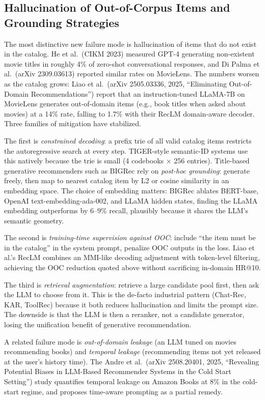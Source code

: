 \subsection{Hallucination of Out-of-Corpus Items and Grounding Strategies}\label{hallucination-of-out-of-corpus-items-and-grounding-strategies}

The most distinctive new failure mode is hallucination of items that do not exist in the catalog. He et al.~(CIKM 2023) measured GPT-4 generating non-existent movie titles in roughly 4\% of zero-shot conversational responses, and Di Palma et al.~(arXiv 2309.03613) reported similar rates on MovieLens. The numbers worsen as the catalog grows: Liao et al.~(arXiv 2505.03336, 2025, ``Eliminating Out-of-Domain Recommendations'') report that an instruction-tuned LLaMA-7B on MovieLens generates out-of-domain items (e.g., book titles when asked about movies) at a 14\% rate, falling to 1.7\% with their RecLM domain-aware decoder. Three families of mitigation have stabilized.

The first is \emph{constrained decoding}: a prefix trie of all valid catalog items restricts the autoregressive search at every step. TIGER-style semantic-ID systems use this natively because the trie is small (4 codebooks × 256 entries). Title-based generative recommenders such as BIGRec rely on \emph{post-hoc grounding}: generate freely, then map to nearest catalog item by L2 or cosine similarity in an embedding space. The choice of embedding matters: BIGRec ablates BERT-base, OpenAI text-embedding-ada-002, and LLaMA hidden states, finding the LLaMA embedding outperforms by 6--9\% recall, plausibly because it shares the LLM's semantic geometry.

The second is \emph{training-time supervision against OOC}: include ``the item must be in the catalog'' in the system prompt, penalize OOC outputs in the loss. Liao et al.'s RecLM combines an MMI-like decoding adjustment with token-level filtering, achieving the OOC reduction quoted above without sacrificing in-domain HR@10.

The third is \emph{retrieval augmentation}: retrieve a large candidate pool first, then ask the LLM to choose from it. This is the de-facto industrial pattern (Chat-Rec, KAR, ToolRec) because it both reduces hallucination and limits the prompt size. The downside is that the LLM is then a reranker, not a candidate generator, losing the unification benefit of generative recommendation.

A related failure mode is \emph{out-of-domain leakage} (an LLM tuned on movies recommending books) and \emph{temporal leakage} (recommending items not yet released at the user's history time). The Andre et al.~(arXiv 2508.20401, 2025, ``Revealing Potential Biases in LLM-Based Recommender Systems in the Cold Start Setting'') study quantifies temporal leakage on Amazon Books at 8\% in the cold-start regime, and proposes time-aware prompting as a partial remedy.

